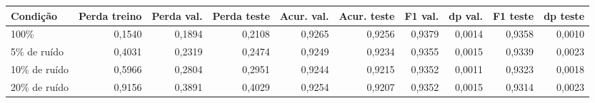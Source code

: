 \begin{tabular}{lrrrrrrrrr}
\toprule
Condição & Perda treino & Perda val. & Perda teste & Acur. val. & Acur. teste & F1 val. & dp val. & F1 teste & dp teste \\
\midrule
100\% & 0,1540 & 0,1894 & 0,2108 & 0,9265 & 0,9256 & 0,9379 & 0,0014 & 0,9358 & 0,0010 \\
5\% de ruído & 0,4031 & 0,2319 & 0,2474 & 0,9249 & 0,9234 & 0,9355 & 0,0015 & 0,9339 & 0,0023 \\
10\% de ruído & 0,5966 & 0,2804 & 0,2951 & 0,9244 & 0,9215 & 0,9352 & 0,0011 & 0,9323 & 0,0018 \\
20\% de ruído & 0,9156 & 0,3891 & 0,4029 & 0,9254 & 0,9207 & 0,9352 & 0,0015 & 0,9314 & 0,0023 \\
\bottomrule
\end{tabular}
